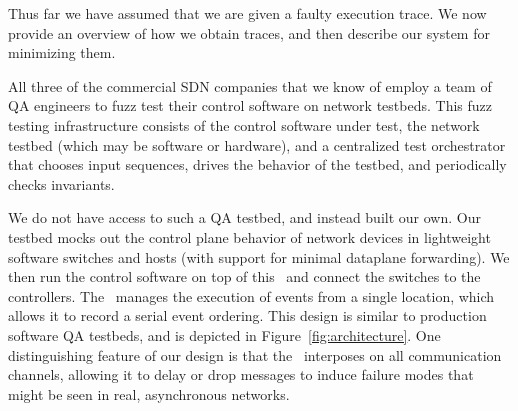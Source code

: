 
Thus far we have assumed that we are given a faulty execution
trace. We now provide an overview of
how we obtain traces, and then describe our system for
minimizing them.

 All three of the commercial SDN companies
that we know of employ a team of QA
engineers to fuzz test their control software on network testbeds.
This fuzz testing infrastructure
consists of the control software under test, the network testbed (which may
be software or hardware), and a centralized
test orchestrator
that chooses input sequences, drives the behavior of the testbed,
and periodically checks invariants. %


We do not have access to such a QA testbed, and instead built our own.
Our testbed mocks out the control plane
behavior of network devices in lightweight software switches and hosts (with
support for minimal dataplane forwarding).
We then run the control software on
top of this \tester~and connect the switches to the
controllers. The \tester~manages the execution of events from a single location,
which allows it to record a serial
event ordering. This design is similar to production software QA testbeds, and is
depicted in Figure~\ref{fig:architecture}. One distinguishing feature of our
design is that
the \tester~interposes on all communication
channels, allowing it to delay or drop
messages to induce failure modes that might be seen in
real, asynchronous networks.


